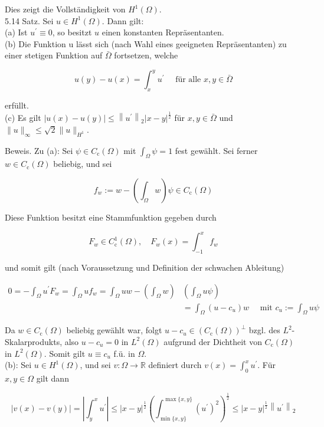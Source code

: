 \documentclass[10pt, letterpaper]{article}
\begin{document}
Dies zeigt die Vollständigkeit von $H^{1}(\Omega)$.\\
5.14 Satz. Sei $u \in H^{1}(\Omega)$. Dann gilt:\\
(a) Ist $u^{\prime} \equiv 0$, so besitzt $u$ einen konstanten Repräsentanten.\\
(b) Die Funktion u lässt sich (nach Wahl eines geeigneten Repräsentanten) zu einer stetigen Funktion auf $\bar{\Omega}$ fortsetzen, welche

$$
u(y)-u(x)=\int_{x}^{y} u^{\prime} \quad \text { für alle } x, y \in \bar{\Omega}
$$

erfüllt.\\
(c) Es gilt $|u(x)-u(y)| \leq\left\|u^{\prime}\right\|_{2}|x-y|^{\frac{1}{2}}$ für $x, y \in \bar{\Omega}$ und $\|u\|_{\infty} \leq \sqrt{2}\|u\|_{H^{1}}$.

Beweis. Zu (a): Sei $\psi \in C_{\mathrm{c}}(\Omega)$ mit $\int_{\Omega} \psi=1$ fest gewählt. Sei ferner $w \in C_{\mathrm{c}}(\Omega)$ beliebig, und sei

$$
f_{w}:=w-\left(\int_{\Omega} w\right) \psi \in C_{\mathrm{c}}(\Omega)
$$

Diese Funktion besitzt eine Stammfunktion gegeben durch

$$
F_{w} \in C_{\mathrm{c}}^{1}(\Omega), \quad F_{w}(x)=\int_{-1}^{x} f_{w}
$$

und somit gilt (nach Voraussetzung und Definition der schwachen Ableitung)

$$
\begin{aligned}
0=-\int_{\Omega} u^{\prime} F_{w}=\int_{\Omega} u f_{w}=\int_{\Omega} u w-\left(\int_{\Omega} w\right) & \left(\int_{\Omega} u \psi\right) \\
& =\int_{\Omega}\left(u-c_{u}\right) w \quad \text { mit } c_{u}:=\int_{\Omega} u \psi
\end{aligned}
$$

Da $w \in C_{\mathrm{c}}(\Omega)$ beliebig gewählt war, folgt $u-c_{u} \in\left(C_{\mathrm{c}}(\Omega)\right)^{\perp}$ bzgl. des $L^{2}$-Skalarprodukts, also $u-c_{u}=0$ in $L^{2}(\Omega)$ aufgrund der Dichtheit von $C_{\mathrm{c}}(\Omega)$ in $L^{2}(\Omega)$. Somit gilt $u \equiv c_{u}$ f.ü. in $\Omega$.\\
(b): Sei $u \in H^{1}(\Omega)$, und sei $v: \Omega \rightarrow \mathbb{R}$ definiert durch $v(x)=\int_{0}^{x} u^{\prime}$. Für $x, y \in \Omega$ gilt dann

$$
|v(x)-v(y)|=\left|\int_{y}^{x} u^{\prime}\right| \leq|x-y|^{\frac{1}{2}}\left(\int_{\min \{x, y\}}^{\max \{x, y\}}\left(u^{\prime}\right)^{2}\right)^{\frac{1}{2}} \leq|x-y|^{\frac{1}{2}}\left\|u^{\prime}\right\|_{2}
$$
\end{document}
